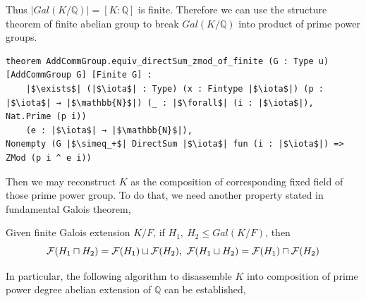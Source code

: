 Thus $\mid Gal(K/\mathbb{Q}) \mid = [K : \mathbb{Q}]$ is finite. Therefore we can use the structure theorem of finite abelian group to break $Gal(K/\mathbb{Q})$ into product of prime power groups.
\begin{listing}[!htpb]
\begin{verbatim}
theorem AddCommGroup.equiv_directSum_zmod_of_finite (G : Type u) [AddCommGroup G] [Finite G] : 
    |$\exists$| (|$\iota$| : Type) (x : Fintype |$\iota$|) (p : |$\iota$| → |$\mathbb{N}$|) (_ : |$\forall$| (i : |$\iota$|), Nat.Prime (p i)) 
    (e : |$\iota$| → |$\mathbb{N}$|),
Nonempty (G |$\simeq_+$| DirectSum |$\iota$| fun (i : |$\iota$|) => ZMod (p i ^ e i))
\end{verbatim}
\end{listing}
\newline
Then we may reconstruct $K$ as the composition of corresponding fixed field of those prime power group. To do that, we need another property stated in fundamental Galois theorem,
\begin{thm}
    \label{thm:thm-32}
    Given finite Galois extension $K/F$, if $H_1, \ H_2 \leq Gal(K/F)$, then
    \begin{equation}
    \notag
    \mathcal{F}(H_1 \sqcap H_2) = \mathcal{F}(H_1) \sqcup \mathcal{F}(H_2), \ \mathcal{F}(H_1 \sqcup H_2) = \mathcal{F}(H_1) \sqcap \mathcal{F}(H_2)
    \end{equation}
\end{thm}
\noindent
In particular, the following algorithm to disassemble $K$ into composition of prime power degree abelian extension of $\mathbb{Q}$ can be established,

